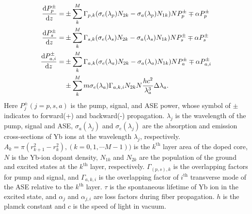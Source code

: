 \documentclass{osa-article}
\begin{document}
\begin{align}
  \dv{P^{\pm}_{p}}{z} = &\pm \sum_{k}^{M} \Gamma_{p, k} (\sigma_{e}(\lambda_{p})N_{2k} - \sigma_{a}(\lambda_{p})N_{1k})NP^{\pm}_{p} \mp \alpha P^{\pm}_{p} \label{eq:PumpPropagationEquation}\\
  \dv{P^{\pm}_{s}}{z} = &\pm \sum_{k}^{M} \Gamma_{s, k} (\sigma_{e}(\lambda_{s})N_{2k} - \sigma_{a}(\lambda_{s})N_{1k})NP^{\pm}_{s} \mp \alpha P^{\pm}_{s} \label{eq:SignalPropagationEquation}\\
  \dv{P^{\pm}_{a, i}}{z} = &\pm \sum_{k}^{M} \Gamma_{a, k} (\sigma_{e}(\lambda_{a})N_{2k} - \sigma_{a}(\lambda_{a})N_{1k})NP^{\pm}_{a} \mp \alpha P^{\pm}_{a, i} \nonumber \\
  &\pm \sum_{k}^{M} m\sigma_{e}(\lambda_{a})\Gamma_{a, k, i} N_{2k}N \frac{hc^{2}}{\lambda_{a}^{3}} \Delta\lambda_{a}. \label{eq:ASEPropagationEquation}
\end{align}
Here $P^{\pm}_{j} (j = p, s, a)$ is the pump, signal, and ASE power, whose symbol of $\pm$ indicates to forward(+) and backward(-) propagation.
$\lambda_{j}$ is the wavelength of the pump, signal and ASE, $\sigma_{a}(\lambda_{j})$ and $\sigma_{e}(\lambda_{j})$ are the absorption and emission cross-sections of Yb ions at the wavelength $\lambda_{j}$, respectively.
$A_{k} = \pi(r_{k+1}^2 - r_{k}^{2}), (k = 0, 1, \cdots M-1))$ is the $k^{\mathrm{th}}$ layer area of the doped core, $N$ is the Yb-ion dopant density, $N_{1k}$ and $N_{2k}$ are the population of the ground and excited states at the $k^{\mathrm{th}}$ layer, respectively.
$\Gamma_{(p, s), k}$ is the overlapping factors for pump and signal, and $\Gamma_{a, k, i}$ is the overlapping factor of $i^{\mathrm{th}}$ transverse mode of the ASE relative to the $k^{\mathrm{th}}$ layer.
$\tau$ is the spontaneous lifetime of Yb ion in the excited state, and $\alpha_{j}$ and $\alpha_{j, i}$ are loss factors during fiber propagation.
$h$ is the plamck constant and $c$ is the speed of light in vacuum.
\end{document}
